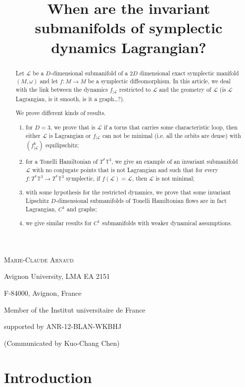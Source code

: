 \documentclass{dcds}
\title[invariant submanifolds of symplectic    dynamics]
      {When are the invariant submanifolds of symplectic    dynamics Lagrangian?}
\author[Marie-Claude Arnaud]{}
\theoremstyle{definition}
\begin{document}
\maketitle

\centerline{\scshape Marie-Claude Arnaud}
\medskip
{\footnotesize
 \centerline{Avignon University, LMA EA 2151}
   \centerline{F-84000, Avignon, France}
    \centerline{Member of the Institut universitaire de France}
   \centerline {supported by ANR-12-BLAN-WKBHJ}
} 

\bigskip

 \centerline{(Communicated by Kuo-Chang Chen)}

\begin{abstract}
Let ${\mathcal {L}}$ be a  $D$-dimensional submanifold   of a $2D$ dimensional exact symplectic manifold  $(M, \omega)$ and let $f: M\rightarrow M$ be a symplectic diffeomorphism. In this article, we deal with the link between the dynamics $f_{|{\mathcal {L}}}$ restricted to ${\mathcal {L}}$ and the geometry of ${\mathcal {L}}$ (is ${\mathcal {L}}$ Lagrangian, is it smooth, is it a graph\dots?).

 We prove different kinds of results.
\begin{enumerate}
\item for $D=3$, we prove that is ${\mathcal {L}}$ if a torus that carries some characteristic loop, then either ${\mathcal {L}}$ is Lagrangian or $f_{|{\mathcal {L}}}$ can not be  minimal (i.e. all the orbits are dense) with $(f^k_{|{\mathcal {L}}})$ equilipschitz;
\item for a Tonelli Hamiltonian of $T^*{\mathbb {T}}^3$, we give an example of an invariant    submanifold ${\mathcal {L}}$ with no conjugate points  that is not Lagrangian and such that for every $f:T^*{\mathbb {T}}^3\rightarrow T^*{\mathbb {T}}^3$ symplectic, if $f({\mathcal {L}})={\mathcal {L}}$, then ${\mathcal {L}}$ is not minimal;
\item with some hypothesis for the restricted dynamics, we prove that some invariant Lipschitz $D$-dimensional submanifolds of Tonelli Hamiltonian flows are in fact Lagrangian, $C^1$ and graphs;
\item we give similar results for $C^1$ submanifolds with weaker dynamical assumptions.
\end{enumerate}

\end{abstract}

\section{Introduction}
\end{document}
